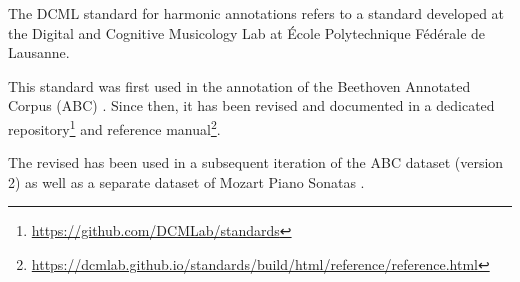 

The DCML standard for harmonic annotations refers to a
standard developed at the Digital and Cognitive Musicology
Lab at \'Ecole Polytechnique F\'ed\'erale de Lausanne.

This standard was first used in the annotation of the
Beethoven Annotated Corpus (ABC)
\parencite{neuwirth2018annotated}. Since then, it has been
revised and documented in a dedicated
repository\footnote{\href{https://github.com/DCMLab/standards}{https://github.com/DCMLab/standards}}
and reference
manual\footnote{\href{https://dcmlab.github.io/standards/build/html/reference/reference.html}{https://dcmlab.github.io/standards/build/html/reference/reference.html}}.

The revised has been used in a subsequent iteration of the
ABC dataset (version 2) as well as a separate dataset of
Mozart Piano Sonatas \parencite{hentschel2021annotated}.
